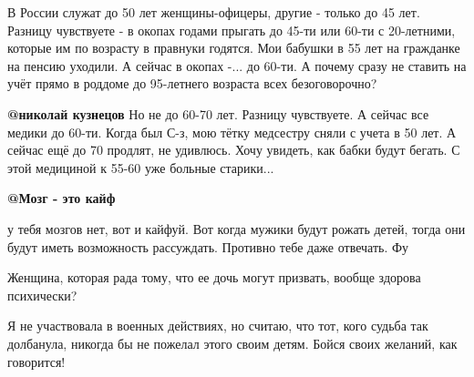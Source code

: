 \begin{itemize}
В России служат до 50 лет женщины-офицеры, другие - только до 45 лет. Разницу
чувствуете - в окопах годами прыгать до 45-ти или 60-ти с 20-летними, которые
им по возрасту в правнуки годятся. Мои бабушки в 55 лет на гражданке на пенсию
уходили. А сейчас в окопах -... до 60-ти. А почему сразу не ставить на учёт
прямо в роддоме до 95-летнего возраста всех безоговорочно?

\textbf{@николай кузнецов}  Но не до 60-70 лет. Разницу чувствуете. А сейчас все медики
до 60-ти. Когда был С-з, мою тётку медсестру сняли с учета в 50 лет. А сейчас
ещё до 70 продлят, не удивлюсь. Хочу увидеть, как бабки будут бегать. С этой
медициной к 55-60 уже больные старики...

\textbf{@Мозг - это кайф}  

у тебя мозгов нет, вот и кайфуй. Вот когда мужики будут рожать детей, тогда они
будут иметь возможность рассуждать. Противно тебе даже отвечать. Фу 


\end{itemize} %


Женщина, которая рада тому, что ее дочь могут призвать, вообще здорова
психически? 

Я не участвовала в военных действиях, но считаю, что тот, кого судьба так
долбанула, никогда бы не пожелал этого своим детям. Бойся своих желаний, как
говорится! 

